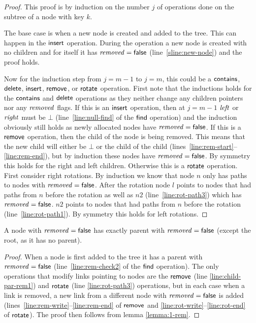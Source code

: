 \begin{proof}
This proof is by induction on the number $j$ of operations done on the subtree of a node with key $k$.

The base case is when a new node is created and added to the tree.
This can happen in the $\act{insert}$ operation.
During the operation a new node is created with no children and for itself it has $\ms{removed}=\lit{false}$ (line~\ref{sline:new-node}) and the proof holds.

Now for the induction step from $j=m-1$ to $j=m$, this could be a $\act{contains}$, $\act{delete}$, $\act{insert}$, $\act{remove}$, or $\act{rotate}$ operation.
First note that the inductions holds for the $\act{contains}$ and $\act{delete}$ operations as they neither change any children pointers nor any $\ms{removed}$ flags.
If this is an $\act{insert}$ operation, then at $j=m-1$ $\ms{left}$ or $\ms{right}$ must be $\bot$ (line~\ref{line:null-find} of the $\act{find}$ operation) and the induction obviously still holds
as newly allocated nodes have $\ms{removed}=\lit{false}$.
If this is a $\act{remove}$ operation, then the child of the node is being removed.
This means that the new child will either be $\bot$ or the child of the child (lines~\ref{line:rem-start}--\ref{line:rem-end}), 
but by induction these nodes have $\ms{removed}=\lit{false}$.
By symmetry this holds for the right and left children.
Otherwise this is a $\act{rotate}$ operation.
First consider right rotations.
By induction we know that node $n$ only has paths to nodes with $\ms{removed}=\lit{false}$.
After the rotation node $l$ points to nodes that had paths from $n$ before the rotation as well as $n2$ (line~\ref{line:rot-path3}) which has $\ms{removed}=\lit{false}$.
$n2$ points to nodes that had paths from $n$ before the rotation (line~\ref{line:rot-path1}).%
By symmetry this holds for left rotations.
\end{proof}


\begin{lemma}
\label{lemma:false-rem-par}
A node with $\ms{removed}=\lit{false}$ has exactly parent with $\ms{removed}=\lit{false}$ (except the root, as it has no parent).
\end{lemma}
\begin{proof}
When a node is first added to the tree it has a parent with $\ms{removed}=\lit{false}$ (line~\ref{line:rem-check2} of the $\act{find}$ operation).
The only operations that modify links pointing to nodes are the $\act{remove}$ (line \ref{line:child-par-rem1}) and $\act{rotate}$ (line \ref{line:rot-path3}) operations,
but in each case when a link is removed, a new link from a different node with $\ms{removed}=\lit{false}$ is added
(lines~\ref{line:rem-write}--\ref{line:rem-end} of $\act{remove}$ and \ref{line:rot-write}--\ref{line:rot-end} of $\act{rotate}$).
The proof then follows from lemma \ref{lemma:1-rem}.
\end{proof}



